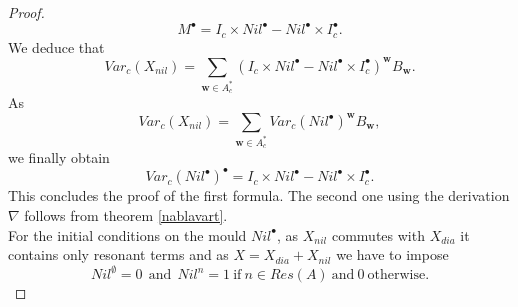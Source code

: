 \documentclass[english,11pt]{amsart}
\def\ww{\mathbf{w}}
\def\di{\displaystyle}
\begin{document}
\begin{proof}
\begin{equation}
    M^{\bullet} =I_c \times Nil^{\bullet} -Nil^{\bullet} \times I_c^{\bullet} .
\end{equation}
We deduce that 
\begin{equation}
    Var_c (X_{nil} ) =\di\sum_{\ww \in A_c^*} \left ( I_c \times Nil^{\bullet} -Nil^{\bullet} \times I_c^{\bullet} \right )^{\ww} B_{\ww} .
\end{equation}
As 
\begin{equation}
    Var_c (X_{nil} ) =\di\sum_{\ww \in A_c^*} Var_c (Nil^{\bullet} )^{\ww} B_{\ww} ,
\end{equation}
we finally obtain
\begin{equation}
    Var_c (Nil^{\bullet} )^{\bullet} = I_c \times Nil^{\bullet} -Nil^{\bullet} \times I_c^{\bullet} .
\end{equation}
This concludes the proof of the first formula. The second one using the derivation $\nabla$ follows from theorem \ref{nablavart}. \\

For the initial conditions on the mould $Nil^{\bullet}$, as $X_{nil}$ commutes with $X_{dia}$ it contains only resonant terms and as $X=X_{dia} +X_{nil}$ we have to impose 
\begin{equation}
    Nil^{\emptyset} =0\ \ \mbox{and}\ \ Nil^{n} =1\ \mbox{if}\ n\in Res (A)\ \mbox{and}\ 0\ \mbox{otherwise.} 
\end{equation}
\end{proof}
\end{document}
